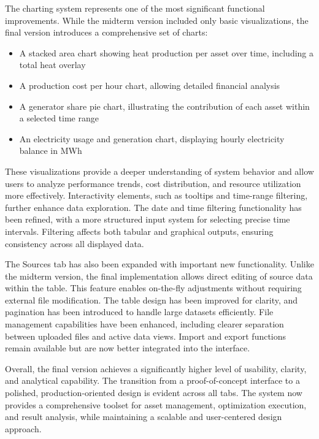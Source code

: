 \hspace*{1cm}The charting system represents one of the most significant functional improvements. While the midterm version included only basic visualizations, the final version introduces a comprehensive set of charts:
\begin{itemize}
\item A stacked area chart showing heat production per asset over time, including a total heat overlay
\item A production cost per hour chart, allowing detailed financial analysis
\item A generator share pie chart, illustrating the contribution of each asset within a selected time range
\item An electricity usage and generation chart, displaying hourly electricity balance in MWh
\end{itemize}

\hspace*{1cm}These visualizations provide a deeper understanding of system behavior and allow users to analyze performance trends, cost distribution, and resource utilization more effectively. Interactivity elements, such as tooltips and time-range filtering, further enhance data exploration.
The date and time filtering functionality has been refined, with a more structured input system for selecting precise time intervals. Filtering affects both tabular and graphical outputs, ensuring consistency across all displayed data.

\hspace*{1cm}The Sources tab has also been expanded with important new functionality. Unlike the midterm version, the final implementation allows direct editing of source data within the table. This feature enables on-the-fly adjustments without requiring external file modification. The table design has been improved for clarity, and pagination has been introduced to handle large datasets efficiently.
File management capabilities have been enhanced, including clearer separation between uploaded files and active data views. Import and export functions remain available but are now better integrated into the interface.

\hspace*{1cm}Overall, the final version achieves a significantly higher level of usability, clarity, and analytical capability. The transition from a proof-of-concept interface to a polished, production-oriented design is evident across all tabs. The system now provides a comprehensive toolset for asset management, optimization execution, and result analysis, while maintaining a scalable and user-centered design approach.

